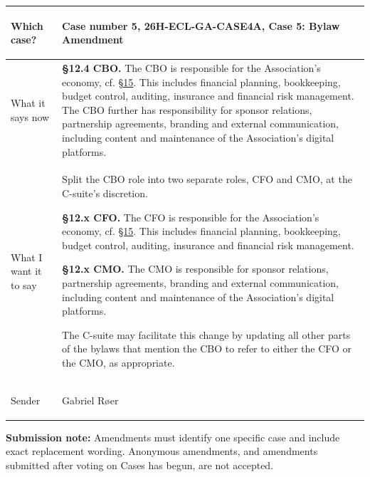 \documentclass{../../Common/Latex/Templates/rapport}
\begin{document}
\vspace{0.4cm}
\begin{tabularx}{\textwidth}{|>{\bfseries\raggedright\arraybackslash}p{3.7cm}|X|}
  \hline
  Which case?
   & \rule{0pt}{1.2cm}Case number 5, 26H-ECL-GA-CASE4A, Case 5: Bylaw Amendment                                                                                                                                                                                                                                                                                                                                                                       \\
  \hline
  What it says now
   & \textbf{\S 12.4 CBO.}\label{bylaw:12.4} The CBO is responsible for the Association's economy, cf. \hyperref[bylaw:15]{\S 15}. This includes financial planning, bookkeeping, budget control, auditing, insurance and financial risk management. The CBO further has responsibility for sponsor relations, partnership agreements, branding and external communication, including content and maintenance of the Association's digital platforms. \\
  \hline
  What I want it to say
   & Split the CBO role into two separate roles, CFO and CMO, at the C-suite's discretion.\par\medskip
  \textbf{\S 12.x CFO.} The CFO is responsible for the Association's economy, cf. \hyperref[bylaw:15]{\S 15}. This includes financial planning, bookkeeping, budget control, auditing, insurance and financial risk management.\par\medskip
  \textbf{\S 12.x CMO.} The CMO is responsible for sponsor relations, partnership agreements, branding and external communication, including content and maintenance of the Association's digital platforms.\par\medskip
  The C-suite may facilitate this change by updating all other parts of the bylaws that mention the CBO to refer to either the CFO or the CMO, as appropriate.                                                                                                                                                                                                                                                                                        \\
  \hline
  Sender
   & \rule{0pt}{1.2cm}Gabriel Røer                                                                                                                                                                                                                                                                                                                                                                                                                    \\
  \hline
\end{tabularx}

\vfill
\textbf{Submission note:} Amendments must identify one specific case and include exact replacement wording. Anonymous amendments, and amendments submitted after voting on Cases has begun, are not accepted.
\end{document}
